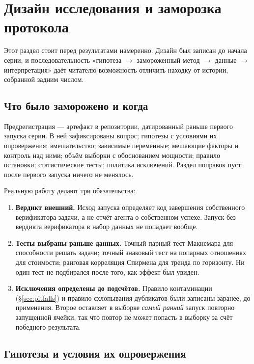 \section{Дизайн исследования и заморозка протокола}
\label{sec:design}

Этот раздел стоит перед результатами намеренно. Дизайн был записан до начала
серии, и последовательность «гипотеза $\rightarrow$ замороженный метод
$\rightarrow$ данные $\rightarrow$ интерпретация» даёт читателю возможность
отличить находку от истории, собранной задним числом.

\subsection{Что было заморожено и когда}

Предрегистрация — артефакт в репозитории, датированный раньше первого запуска
серии\code. В ней зафиксированы вопрос; гипотезы с условиями их опровержения;
вмешательство; зависимые переменные; мешающие факторы и контроль над ними;
объём выборки с обоснованием мощности; правило остановки; статистические
тесты; политика исключений. Раздел поправок пуст: после первого запуска
ничего не менялось.

Реальную работу делают три обязательства:

\begin{enumerate}
\item \textbf{Вердикт внешний.} Исход запуска определяет код завершения
      собственного верификатора задачи, а не отчёт агента о собственном
      успехе. Запуск без вердикта верификатора в набор данных не попадает
      вообще.
\item \textbf{Тесты выбраны раньше данных.} Точный парный тест Макнемара для
      способности решать задачи; точный знаковый тест на попарных отношениях
      для стоимости; ранговая корреляция Спирмена для тренда по горизонту.
      Ни один тест не подбирался после того, как эффект был увиден.
\item \textbf{Исключения определены до подсчётов.} Правило контаминации
      (\S\ref{sec:pitfalls}) и правило схлопывания дубликатов были записаны
      заранее, до применения. Второе оставляет в выборке \emph{самый ранний}
      запуск повторно запущенной ячейки, так что повтор не может попасть в
      выборку за счёт победного результата.
\end{enumerate}

\subsection{Гипотезы и условия их опровержения}

